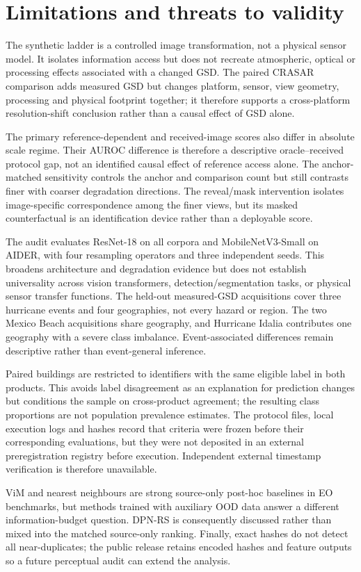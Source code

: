 \section{Limitations and threats to validity}

The synthetic ladder is a controlled image transformation, not a physical
sensor model. It isolates information access but does not recreate atmospheric,
optical or processing effects associated with a changed GSD. The paired
CRASAR comparison adds measured GSD but changes platform, sensor, view geometry,
processing and physical footprint together; it therefore supports a
cross-platform resolution-shift conclusion rather than a causal effect of GSD
alone.

The primary reference-dependent and received-image scores also differ in
absolute scale regime. Their AUROC difference is therefore a descriptive
oracle--received protocol gap, not an identified causal effect of reference
access alone. The anchor-matched sensitivity controls the anchor and comparison
count but still contrasts finer with coarser degradation directions.
The reveal/mask intervention isolates image-specific correspondence among the
finer views, but its masked counterfactual is an identification device rather
than a deployable score.

The audit evaluates ResNet-18 on all corpora and MobileNetV3-Small on AIDER,
with four resampling operators and three independent seeds. This broadens
architecture and degradation evidence but does not establish universality
across vision transformers, detection/segmentation tasks, or physical sensor
transfer functions. The held-out measured-GSD acquisitions cover three
hurricane events and four geographies, not every hazard or region. The two
Mexico Beach acquisitions share geography, and Hurricane Idalia contributes
one geography with a severe class imbalance. Event-associated differences
remain descriptive rather than event-general inference.

Paired buildings are restricted to identifiers with the same eligible label in
both products. This avoids label disagreement as an explanation for prediction
changes but conditions the sample on cross-product agreement; the resulting
class proportions are not population prevalence estimates. The protocol files,
local execution logs and hashes record that criteria were frozen before their
corresponding evaluations, but they were not deposited in an external
preregistration registry before execution. Independent external timestamp
verification is therefore unavailable.

ViM and nearest neighbours are strong source-only post-hoc baselines in EO
benchmarks, but methods trained with auxiliary OOD data answer a different
information-budget question. DPN-RS is consequently discussed rather than
mixed into the matched source-only ranking. Finally, exact hashes do not detect
all near-duplicates; the public release retains encoded hashes and feature
outputs so a future perceptual audit can extend the analysis.
